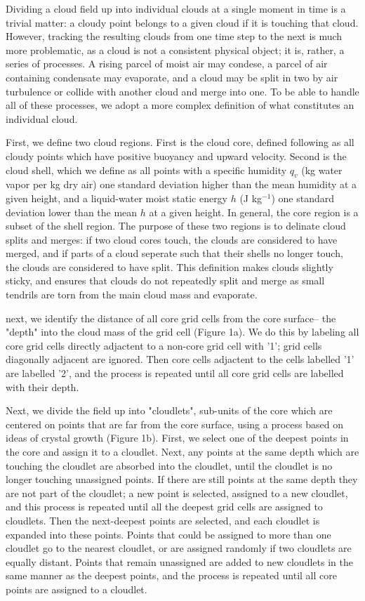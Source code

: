 \documentclass[12pt]{article}
\begin{document}
Dividing a cloud field up into individual clouds at a single moment in time is 
a trivial matter: a cloudy point belongs to a given cloud if it is touching 
that cloud.  However, tracking the resulting clouds from one time step to the 
next is much more problematic, as a cloud is not a consistent physical object; 
it is, rather, a series of processes.  A rising parcel of moist air may 
condese, a parcel of air containing condensate may evaporate, and a cloud may 
be split in two by air turbulence or collide with another cloud and merge into 
one.  To be able to handle all of these processes, we adopt a more complex 
definition of what constitutes an individual cloud.

First, we define two cloud regions.  First is the cloud core, defined following 
\cite{Siebesma1995} as all cloudy points which have positive buoyancy and 
upward velocity.  Second is the cloud shell, which we define as all points 
with a specific humidity $q_v$ (kg water vapor per kg dry air) one standard 
deviation higher than the mean humidity at a given height, and a liquid-water
moist static energy $h$ (J kg$^{-1}$) one standard deviation lower than the 
mean $h$ at a given height.  In general, the core region is a subset of the 
shell region.  The purpose of these two regions is to delinate cloud splits 
and merges: if two cloud cores touch, the clouds are considered to have merged, 
and if parts of a cloud seperate such that their shells no longer touch, the 
clouds are considered to have split.  This definition makes clouds slightly 
sticky, and ensures that clouds do not repeatedly split and merge as small 
tendrils are torn from the main cloud mass and evaporate.

next, we identify the distance of all core grid cells from the core surface--
the "depth" into the cloud mass of the grid cell (Figure 1a).  We do 
this by labeling all core grid cells directly adjactent to a non-core grid 
cell with '1'; grid cells diagonally adjacent are ignored.  Then core cells 
adjactent to the cells labelled '1' are labelled '2', and the process is 
repeated until all core grid cells are labelled with their depth.

Next, we divide the field up into "cloudlets", sub-units of the core which are 
centered on points that are far from the core surface, using a process based 
on ideas of crystal growth (Figure 1b).  First, we select one of the deepest 
points in the core and assign it to a cloudlet.  Next, any points at the same 
depth which are touching the cloudlet are absorbed into the cloudlet, until the 
cloudlet is no longer touching unassigned points.  If there are still points at 
the same depth they are not part of the cloudlet; a new point is selected, 
assigned to a new cloudlet, and this process is repeated until all the deepest 
grid cells are assigned to cloudlets.  Then the next-deepest points are 
selected, and each cloudlet is expanded into these points.  Points that 
could be assigned to more than one cloudlet go to the nearest cloudlet, or are 
assigned randomly if two cloudlets are equally distant.  Points that remain 
unassigned are added to new cloudlets in the same manner as the deepest points, 
and the process is repeated until all core points are assigned to a cloudlet.
\end{document}
